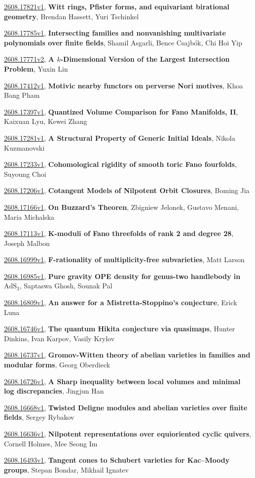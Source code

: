 \documentclass[9pt, a4paper]{article}
\theoremstyle{plain}
\theoremstyle{definition}
\theoremstyle{remark}
\newcommand{\arxiv}[3]{\href{https://arxiv.org/abs/#1}{#1}, \textbf{\textcolor{arxivblue}{#2}}, #3}
\begin{document}
\arxiv{2608.17821v1}{Witt rings, Pfister forms, and equivariant birational geometry}{Brendan Hassett, Yuri Tschinkel}

\arxiv{2608.17785v1}{Intersecting families and nonvanishing multivariate polynomials over finite fields}{Shamil Asgarli, Bence Csajbók, Chi Hoi Yip}

\arxiv{2608.17771v2}{A $k$-Dimensional Version of the Largest Intersection Problem}{Yuxin Lin}

\arxiv{2608.17412v1}{Motivic nearby functors on perverse Nori motives}{Khoa Bang Pham}

\arxiv{2608.17397v1}{Quantized Volume Comparison for Fano Manifolds, II}{Kaixuan Lyu, Kewei Zhang}

\arxiv{2608.17281v1}{A Structural Property of Generic Initial Ideals}{Nikola Kuzmanovski}

\arxiv{2608.17233v1}{Cohomological rigidity of smooth toric Fano fourfolds}{Suyoung Choi}

\arxiv{2608.17206v1}{Cotangent Models of Nilpotent Orbit Closures}{Boming Jia}

\arxiv{2608.17166v1}{On Buzzard's Theoren}{Zbigniew Jelonek, Gustavo Menani, Maria Michalska}

\arxiv{2608.17113v1}{K-moduli of Fano threefolds of rank 2 and degree 28}{Joseph Malbon}

\arxiv{2608.16999v1}{F-rationality of multiplicity-free subvarieties}{Matt Larson}

\arxiv{2608.16985v1}{Pure gravity OPE density for genus-two handlebody in $\text{AdS}_3$}{Saptaswa Ghosh, Sounak Pal}

\arxiv{2608.16809v1}{An answer for a Mistretta-Stoppino's conjecture}{Erick Luna}

\arxiv{2608.16746v1}{The quantum Hikita conjecture via quasimaps}{Hunter Dinkins, Ivan Karpov, Vasily Krylov}

\arxiv{2608.16737v1}{Gromov-Witten theory of abelian varieties in families and modular forms}{Georg Oberdieck}

\arxiv{2608.16726v1}{A Sharp inequality between local volumes and minimal log discrepancies}{Jingjun Han}

\arxiv{2608.16668v1}{Twisted Deligne modules and abelian varieties over finite fields}{Sergey Rybakov}

\arxiv{2608.16636v1}{Nilpotent representations over equioriented cyclic quivers}{Cornell Holmes, Mee Seong Im}

\arxiv{2608.16493v1}{Tangent cones to Schubert varieties for Kac--Moody groups}{Stepan Bondar, Mikhail Ignatev}
\end{document}
